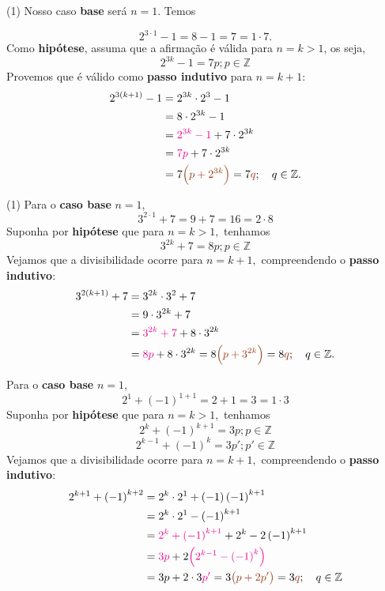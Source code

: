 \documentclass[12pt, a4paper]{article}
\newcommand{\negrito}[1]{\mbox{\boldmath{$#1$}}}
\newcommand{\Z}{\mathbb{Z}}
\newcommand{\itens}[1]{\begin{tasks}[label={(tsk[a])},label-width=3.6ex, label-format = {\bfseries}, column-sep = {0pt}](1) #1\end{tasks}}
\newcommand{\alt}[1]{\textcolor{Floresta}{$\negrito{(#1)} $}}
\begin{document}
\begin{solution}
\itens{
	\task[\alt{a}] Nosso caso \textbf{base} será $n=1.$ Temos
	}
    $$2^{3\cdot1}-1=8-1=7=1\cdot7.$$
    Como \textbf{hipótese}, assuma que a afirmação é válida para $n=k>1$, os seja,
    $$2^{3k}-1=7p;p \in \Z$$
    Provemos que é válido como \textbf{passo indutivo} para $n=k+1:$
    \begin{align*}
    2^{3 \left( k+1 \right) }-1&=2^{3k}\cdot2^{3}-1\\&=8 \cdot 2^{3k} -1 \\&= \textcolor{Magenta}{2^{3k}-1}+7\cdot2^{3k}\\&=\textcolor{Magenta}{7p}+7\cdot2^{3k}\\&=7 \textcolor{RawSienna}{\left( p+2^{3k} \right)} =7\textcolor{RawSienna}{q};\quad q \in \Z.
    \end{align*}
    
    
    \itens{
	\task[\alt{b}] Para o \textbf{caso base} $n=1$,
    $$3^{2\cdot1}+7=9+7=16=2\cdot8$$
    Suponha por \textbf{hipótese} que para $n=k>1,$ tenhamos
    $$3^{2k}+7=8p;p \in \Z$$
    Vejamos que a divisibilidade ocorre para $n=k+1,$ compreendendo o \textbf{passo indutivo}:
    \begin{align*}
    3^{2 \left( k+1 \right) }+7&=3^{2k}\cdot3^{2}+7\\&=9 \cdot 3^{2k}+7\\&=\textcolor{Magenta}{3^{2k}+7}+8\cdot3^{2k}\\&=\textcolor{Magenta}{8p}+8\cdot3^{2k}=8 \textcolor{RawSienna}{\left( p+3^{2k} \right)} =8\textcolor{RawSienna}{q}; \quad q \in \Z.
    \end{align*}

 
\task[\alt{c}] 
    Para o \textbf{caso base} $n=1$,
    $$2^{1}+ \left( -1 \right) ^{1+1}=2+1=3=1\cdot3$$
    Suponha por \textbf{hipótese} que para $n=k>1,$ tenhamos 
    $$2^{k}+ \left( -1 \right) ^{k+1}=3p;p \in \Z$$
    $$2^{k-1}+ \left( -1 \right) ^{k}=3p';p' \in \Z$$
    Vejamos que a divisibilidade ocorre para $n=k+1,$ compreendendo o \textbf{passo indutivo}:
    \begin{align*}
    2^{k+1}+ \left( -1 \right) ^{k+2}&=2^{k}\cdot2^{1}+(-1) \left( -1 \right) ^{k+1}\\&=2^{k}\cdot2^{1}- \left( -1 \right) ^{k+1} \\&=\textcolor{Magenta}{2^{k}+ \left( -1 \right) ^{k+1}}+2^{k}-2 \left( -1 \right) ^{k+1}\\&=
    \textcolor{Magenta}{3p}+2 \textcolor{Magenta}{\left( 2^{k-1}- \left( -1 \right) ^{k} \right)} \\&=3p+2\cdot3\textcolor{Magenta}{p'}=3 \textcolor{RawSienna}{\left( p+2p^{\prime} \right)} =3\textcolor{RawSienna}{q}; \quad q \in \Z
    \end{align*}
}
\end{solution}
\end{document}
